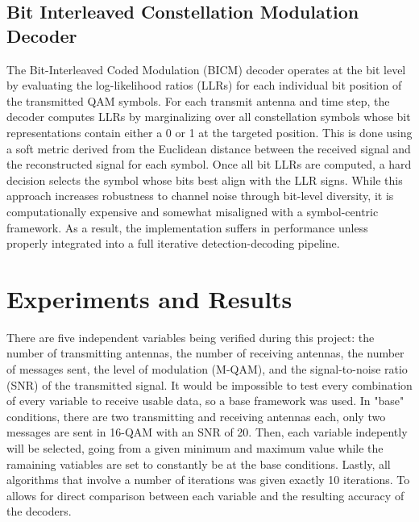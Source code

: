 \documentclass[conference]{IEEEtran}
\begin{document}
\subsection{Bit Interleaved Constellation Modulation Decoder}
The Bit-Interleaved Coded Modulation (BICM) decoder operates at the bit level by evaluating the log-likelihood ratios (LLRs) for each individual bit position of the transmitted QAM symbols. For each transmit antenna and time step, the decoder computes LLRs by marginalizing over all constellation symbols whose bit representations contain either a 0 or 1 at the targeted position. This is done using a soft metric derived from the Euclidean distance between the received signal and the reconstructed signal for each symbol. Once all bit LLRs are computed, a hard decision selects the symbol whose bits best align with the LLR signs. While this approach increases robustness to channel noise through bit-level diversity, it is computationally expensive and somewhat misaligned with a symbol-centric framework. As a result, the implementation suffers in performance unless properly integrated into a full iterative detection-decoding pipeline.

\section{Experiments and Results}
There are five independent variables being verified during this project: the number of transmitting antennas, the number of receiving antennas, the number of messages sent, the level of modulation (M-QAM), and the signal-to-noise ratio (SNR) of the transmitted signal. It would be impossible to test every combination of every variable to receive usable data, so a base framework was used. In "base" conditions, there are two transmitting and receiving antennas each, only two messages are sent in 16-QAM with an SNR of 20. Then, each variable indepently will be selected, going from a given minimum and maximum value while the ramaining vatiables are set to constantly be at the base conditions. Lastly, all algorithms that involve a number of iterations was given exactly 10 iterations. To allows for direct comparison between each variable and the resulting accuracy of the decoders.
\end{document}
